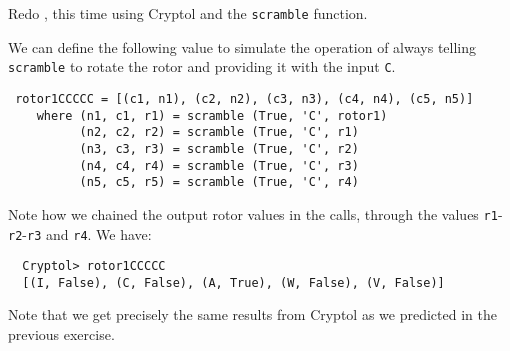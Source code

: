 \begin{Exercise}\label{ex:enigma:3}
  Redo , this time using Cryptol and the
  {\tt scramble} function.
\end{Exercise}
\begin{Answer}
  We can define the following value to simulate the operation of
  always telling {\tt scramble} to rotate the rotor and providing it
  with the input {\tt C}.
\begin{Verbatim}
 rotor1CCCCC = [(c1, n1), (c2, n2), (c3, n3), (c4, n4), (c5, n5)]
    where (n1, c1, r1) = scramble (True, 'C', rotor1)
          (n2, c2, r2) = scramble (True, 'C', r1)
          (n3, c3, r3) = scramble (True, 'C', r2)
          (n4, c4, r4) = scramble (True, 'C', r3)
          (n5, c5, r5) = scramble (True, 'C', r4)
\end{Verbatim}
  Note how we chained the output rotor values in the calls,
through the values {\tt r1}-{\tt r2}-{\tt r3} and {\tt r4}. We have:
\begin{Verbatim}
  Cryptol> rotor1CCCCC
  [(I, False), (C, False), (A, True), (W, False), (V, False)]
\end{Verbatim}
Note that we get precisely the same results from Cryptol as we
predicted in the previous exercise.
\end{Answer}


